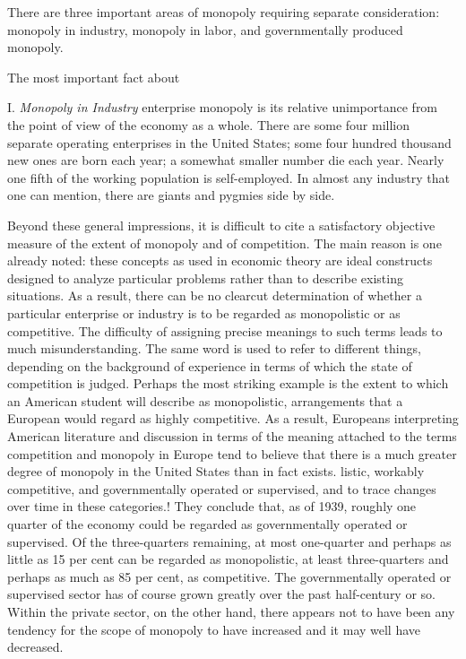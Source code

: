 \documentclass[11pt,openany]{book}
\begin{document}
There are three important areas of monopoly requiring separate consideration: monopoly in industry, monopoly in labor, and governmentally produced monopoly.

The most important fact about

I. \emph{Monopoly in Industry} enterprise monopoly is its relative unimportance from the point of view of the economy as a whole. There are some four million separate operating enterprises in the United States; some four hundred thousand new ones are born each year; a somewhat smaller number die each year. Nearly one fifth of the working population is self-employed. In almost any industry that one can mention, there are giants and pygmies side by side.

Beyond these general impressions, it is difficult to cite a satisfactory objective measure of the extent of monopoly and of competition. The main reason is one already noted: these concepts as used in economic theory are ideal constructs designed to analyze particular problems rather than to describe existing situations. As a result, there can be no clearcut determination of whether a particular enterprise or industry is to be regarded as monopolistic or as competitive. The difficulty of assigning precise meanings to such terms leads to much misunderstanding. The same word is used to refer to different things, depending on the background of experience in terms of which the state of competition is judged. Perhaps the most striking example is the extent to which an American student will describe as monopolistic, arrangements that a European would regard as highly competitive. As a result, Europeans interpreting American literature and discussion in terms of the meaning attached to the terms competition and monopoly in Europe tend to believe that there is a much greater degree of monopoly in the United States than in fact exists. listic, workably competitive, and governmentally operated or supervised, and to trace changes over time in these categories.! They conclude that, as of 1939, roughly one quarter of the economy could be regarded as governmentally operated or supervised. Of the three-quarters remaining, at most one-quarter and perhaps as little as 15 per cent can be regarded as monopolistic, at least three-quarters and perhaps as much as 85 per cent, as competitive. The governmentally operated or supervised sector has of course grown greatly over the past half-century or so. Within the private sector, on the other hand, there appears not to have been any tendency for the scope of monopoly to have increased and it may well have decreased.
\end{document}
